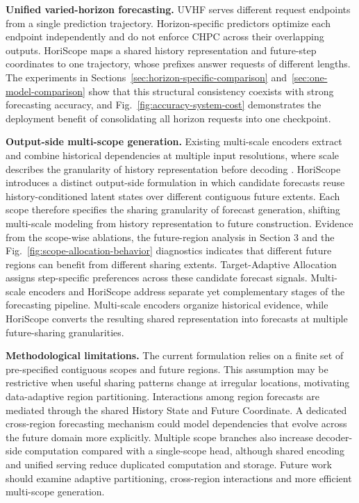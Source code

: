 \documentclass[final,3p,times]{elsarticle}
\begin{document}
\textbf{Unified varied-horizon forecasting.} UVHF serves different request endpoints from a single prediction trajectory. Horizon-specific predictors optimize each endpoint independently and do not enforce CHPC across their overlapping outputs. HoriScope maps a shared history representation and future-step coordinates to one trajectory, whose prefixes answer requests of different lengths. The experiments in Sections~\ref{sec:horizon-specific-comparison} and~\ref{sec:one-model-comparison} show that this structural consistency coexists with strong forecasting accuracy, and Fig.~\ref{fig:accuracy-system-cost} demonstrates the deployment benefit of consolidating all horizon requests into one checkpoint.

\textbf{Output-side multi-scope generation.} Existing multi-scale encoders extract and combine historical dependencies at multiple input resolutions, where scale describes the granularity of history representation before decoding \citep{challu2023nhits,chen2024pathformer,wang2024timemixer}. HoriScope introduces a distinct output-side formulation in which candidate forecasts reuse history-conditioned latent states over different contiguous future extents. Each scope therefore specifies the sharing granularity of forecast generation, shifting multi-scale modeling from history representation to future construction. Evidence from the scope-wise ablations, the future-region analysis in Section 3 and the Fig.~\ref{fig:scope-allocation-behavior} diagnostics indicates that different future regions can benefit from different sharing extents. Target-Adaptive Allocation assigns step-specific preferences across these candidate forecast signals. Multi-scale encoders and HoriScope address separate yet complementary stages of the forecasting pipeline. Multi-scale encoders organize historical evidence, while HoriScope converts the resulting shared representation into forecasts at multiple future-sharing granularities.

\textbf{Methodological limitations.} The current formulation relies on a finite set of pre-specified contiguous scopes and future regions. This assumption may be restrictive when useful sharing patterns change at irregular locations, motivating data-adaptive region partitioning. Interactions among region forecasts are mediated through the shared History State and Future Coordinate. A dedicated cross-region forecasting mechanism could model dependencies that evolve across the future domain more explicitly. Multiple scope branches also increase decoder-side computation compared with a single-scope head, although shared encoding and unified serving reduce duplicated computation and storage. Future work should examine adaptive partitioning, cross-region interactions and more efficient multi-scope generation.
\end{document}
